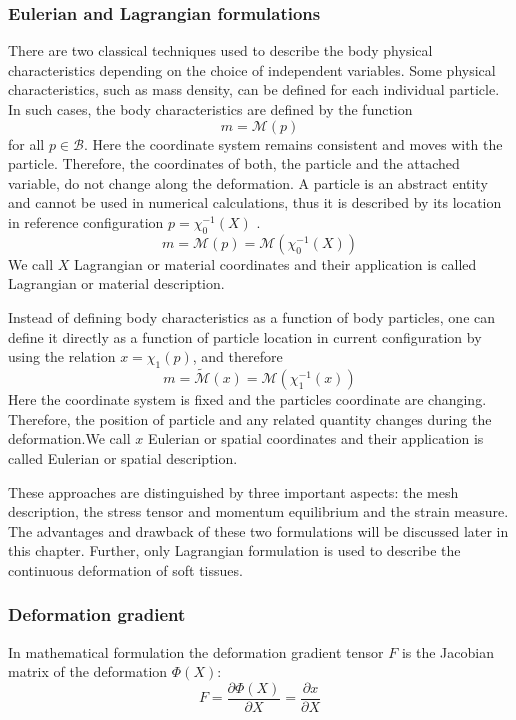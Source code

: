 \subsubsection*{Eulerian and Lagrangian formulations}
There are two classical techniques used to describe the body physical characteristics depending on the choice of independent variables.
 Some physical characteristics, such as mass density, can be defined for each individual particle. In such cases, the body characteristics are defined by the function $$m =  \mathcal{M}(p)$$ for all $p \in \mathcal{B}$. Here the coordinate system remains consistent and moves with the particle. Therefore, the coordinates of both, the particle and the attached variable, do not change along the deformation. A particle is an abstract entity and cannot be used in numerical calculations, thus it is described by its location in reference configuration $p= \chi_0^{-1}(X)$ .
 $$m =  \mathcal{M}(p) = \mathcal{M}(\chi_0^{-1}(X))$$
 We call $X$ Lagrangian or material coordinates and their application is called Lagrangian or material description.  
 

Instead of defining body characteristics as a function of body particles, one can define it directly as a function of particle location in current configuration by using the relation $ x = \chi_1(p)$, and therefore 
$$m = \tilde{ \mathcal{M}}(x) = \mathcal{M}(\chi_1^{-1}(x))$$
 Here the coordinate system is fixed and the particles coordinate are changing. Therefore, the position of particle and any related quantity changes during the deformation.We call $x$ Eulerian or spatial coordinates and their application is called Eulerian or spatial description.
 
 These approaches are distinguished by three important aspects: the mesh description, the stress tensor and momentum equilibrium and the strain measure. The advantages and drawback of these two formulations will be discussed later in this chapter. Further, only Lagrangian formulation is used to describe the continuous deformation of soft tissues.       

\subsubsection*{Deformation gradient}\label{deformatiogradient}

In mathematical formulation the deformation gradient tensor $F$ is the Jacobian matrix of the deformation $\Phi(X)$:
\begin{equation}
F = \frac{\partial \Phi (X)}{\partial X} = \frac{\partial x}{\partial X}
\end{equation}

